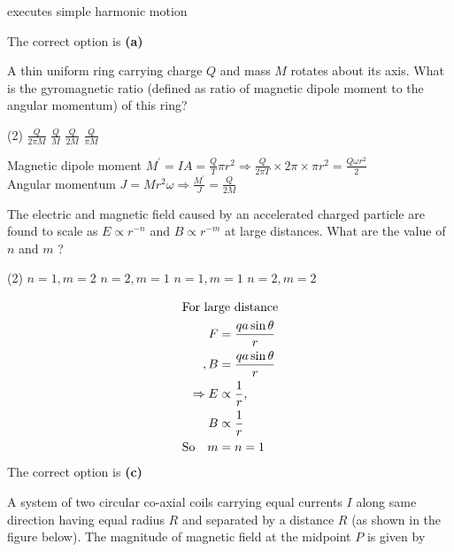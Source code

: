 \begin{enumerate}
\begin{tasks}
		\task[\textbf{D.}]executes simple harmonic motion
	\end{tasks}
	\begin{answer}
		The correct option is \textbf{(a)}
	\end{answer}
	\begin{minipage}{\textwidth}
		\item A thin uniform ring carrying charge $Q$ and mass $M$ rotates about its axis. What is the gyromagnetic ratio (defined as ratio of magnetic dipole moment to the angular momentum) of this ring?
	\end{minipage}
	\begin{tasks}(2)
		\task[\textbf{A.}] $\frac{Q}{2 \pi M}$
		\task[\textbf{B.}]$\frac{Q}{M}$
		\task[\textbf{C.}]$\frac{Q}{2 M}$
		\task[\textbf{D.}]$\frac{Q}{\pi M}$
	\end{tasks}
	\begin{answer}
		Magnetic dipole moment $M^{\prime}=I A=\frac{Q}{T} \pi r^{2} \Rightarrow \frac{Q}{2 \pi T} \times 2 \pi \times \pi r^{2}=\frac{Q \omega r^{2}}{2}$\\
		Angular momentum $J=M r^{2} \omega \Rightarrow \frac{M^{\prime}}{J}=\frac{Q}{2 M}$	
	\end{answer}
	\begin{minipage}{\textwidth}
		\item The electric and magnetic field caused by an accelerated charged particle are found to scale as $E \propto r^{-n}$ and $B \propto r^{-m}$ at large distances. What are the value of $n$ and $m$ ?
	\end{minipage}
	\begin{tasks}(2)
		\task[\textbf{A.}] $n=1, m=2$
		\task[\textbf{B.}] $n=2, m=1$
		\task[\textbf{C.}]$n=1, m=1$
		\task[\textbf{D.}]$n=2, m=2$
	\end{tasks}
	\begin{answer}
	\begin{align*}
		\intertext{For large distance}
	F&=\frac{q a \sin \theta}{r}\\
	, B&=\frac{q a \sin \theta}{r}\\
	\Rightarrow E &\propto \frac{1}{r},\\
	B &\propto \frac{1}{r} \\
	\text{So} \quad m&=n=1
	\end{align*}
		The correct option is \textbf{(c)}	
	\end{answer}
	\begin{minipage}{\textwidth}
		\item A system of two circular co-axial coils carrying equal currents $I$ along same direction having equal radius $R$ and separated by a distance $R$ (as shown in the figure below). The magnitude of magnetic field at the midpoint $P$ is given by

\end{minipage}
\end{enumerate}
